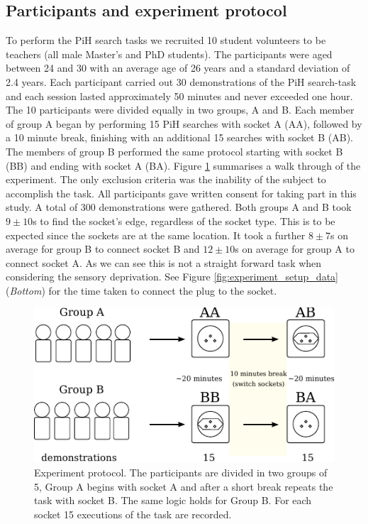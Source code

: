 \documentclass[final,5p,times,twocolumn]{elsarticle}
\begin{document}
\subsection{Participants and experiment protocol}

To perform the PiH search tasks we recruited 10 student volunteers to be teachers (all male Master's and PhD students).
The participants were aged between 24 and 30 with an average age of 26 years and a standard deviation of 2.4 years.
Each participant carried out 30 demonstrations of the PiH search-task and each session lasted approximately 50 minutes and 
never exceeded one hour. The 10 participants were divided equally in two groups, A and B. Each member of group A began 
by performing 15 PiH searches with socket A (AA), followed by a 10 minute break, finishing with an additional 15 searches with socket B (AB). 
The members of group B performed the same protocol starting with socket B (BB) and ending with socket A (BA).
Figure \ref{fig:experiment_design} summarises a walk through of the experiment.
The only exclusion criteria was the inability of the subject to accomplish the task. All participants gave written consent 
for taking part in this study. A total of 300 demonstrations were gathered.
Both groups A and B took $9\pm10$s to find the socket's edge, regardless of the socket type. This is to be expected since the sockets 
are at the same location. It took a further $8\pm7$s on average for group B to connect
socket B and $12\pm10$s on average for group A to connect socket A. As we can see this is not a straight forward task when considering
the sensory deprivation. See Figure \ref{fig:experiment_setup_data} (\textit{Bottom}) for the time taken to connect the plug to the socket.

\begin{figure}
\centering
 \includegraphics[width=0.9\linewidth]{./Figures/Fig/experiment_design_v2.pdf}
 \caption{Experiment protocol. The participants are divided in two groups of 5, Group A begins with socket A 
 and after a short break repeats the task with socket B. The same logic holds for Group B.
 For each socket 15 executions of the task are recorded.}
 \label{fig:experiment_design}
\end{figure}
\end{document}
